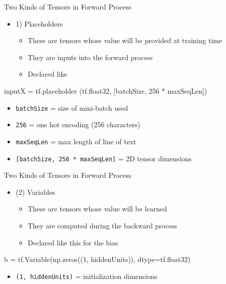 \documentclass[aspectratio=169]{beamer}
\begin{document}
\begin{frame}[fragile]{Two Kinds of Tensors in Forward Process}

\begin{itemize}
\item 1) Placeholders
\begin{itemize}
\item These are tensors whose value will be provided at training time
\item They are inputs into the forward process
\item Declared like 
\end{itemize}
\end{itemize}
\begin{SQL} 
inputX = tf.placeholder
  (tf.float32, [batchSize, 256 * maxSeqLen])
\end{SQL}
\begin{itemize}
\item \texttt{batchSize} = size of mini-batch used 
\item \texttt{256} = one hot encoding (256 characters)
\item \texttt{maxSeqLen} = max length of line of text
\item \texttt{[batchSize, 256 * maxSeqLen]} = 2D tensor dimensions
\end{itemize}
\end{frame}
\begin{frame}[fragile]{Two Kinds of Tensors in Forward Process}

\begin{itemize}
\item (2) Variables
\begin{itemize}
\item These are tensors whose value will be learned
\item They are computed during the backward process
\item Declared like this for the bias
\end{itemize}
\end{itemize}
\begin{SQL} 
b = tf.Variable(np.zeros((1, hiddenUnits)), dtype=tf.float32)
\end{SQL}
\begin{itemize}
\item \texttt{(1, hiddenUnits)} = initialization dimensions
\end{itemize}
\end{frame}
\end{document}
